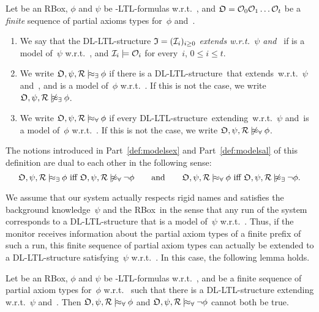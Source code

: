 \begin{definition}[Extensions]\label{def:extensions}
    Let \Rmc be an RBox, $\phi$ and $\psi$ be \SHOQ-LTL-formulas w.r.t.~\Rmc,
    and $\mathfrak{O}=\mathcal{O}_0\mathcal{O}_1\dots\mathcal{O}_t$ be a \emph{finite} sequence of partial
    axioms types for~$\phi$ and~\Rmc.
    \begin{enumerate}
        \item We say that the DL-LTL-structure $\mathfrak{I}=(\mathcal{I}_i)_{i\ge 0}$
            \emph{extends \Omf w.r.t.~$\psi$ and~\Rmc} if \Imf is a model
            of~$\psi$ w.r.t.~\Rmc, and $\mathcal{I}_i\models\mathcal{O}_i$ for every~$i$,
            $0\le i\le t$.
        \item\label{def:modelsex}
            We write $\Omf,\psi,\Rmc\modelsex\phi$ if there is a
            DL-LTL-structure~\Imf that extends~\Omf w.r.t.~$\psi$ and~\Rmc, and
            is a model of~$\phi$ w.r.t.~\Rmc.  If this is not the case, we write
            $\Omf,\psi,\Rmc\notmodelsex\phi$.
        \item\label{def:modelsal}
            We write $\Omf,\psi,\Rmc\modelsal\phi$ if every
            DL-LTL-structure~\Imf extending~\Omf w.r.t.~$\psi$ and~\Rmc is a
            model of~$\phi$ w.r.t.~\Rmc.  If this is not the case, we write
            $\Omf,\psi,\Rmc\notmodelsal\phi$.
    \end{enumerate}
\end{definition}

\noindent
The notions introduced in Part~\ref{def:modelsex} and Part~\ref{def:modelsal} of
this definition are dual to each other in the following sense:
\[\Omf,\psi,\Rmc\modelsex\phi\ \text{iff}\ \Omf,\psi,\Rmc\notmodelsal\lnot\phi%
    \qquad\text{and}\qquad%
    \Omf,\psi,\Rmc\modelsal\phi\ \text{iff}\ \Omf,\psi,\Rmc\notmodelsex\lnot\phi.\]

We assume that our system actually respects rigid names and satisfies the
background knowledge~$\psi$ and the RBox~\Rmc in the sense that any run of the
system corresponds to a DL-LTL-structure that is a model of~$\psi$ w.r.t.~\Rmc.
Thus, if the monitor receives information about the partial axiom types of a
finite prefix of such a run, this finite sequence of partial axiom types can
actually be extended to a DL-LTL-structure satisfying~$\psi$ w.r.t.~\Rmc.  In
this case, the following lemma holds.

\begin{lemma}\label{lem:modelsal}
    Let \Rmc be an RBox, $\phi$ and $\psi$ be \SHOQ-LTL-formulas w.r.t.~\Rmc,
    and \Omf be a finite sequence of partial axiom types for~$\phi$ w.r.t.~\Rmc
    such that there is a DL-LTL-structure extending \Omf w.r.t.~$\psi$ and~\Rmc.
    Then $\Omf,\psi,\Rmc\modelsal\phi$ and $\Omf,\psi,\Rmc\modelsal\lnot\phi$
    cannot both be true.
\end{lemma}

